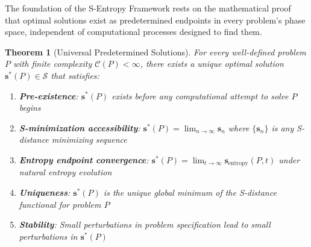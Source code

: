 \documentclass[11pt]{article}
\newtheorem{theorem}{Theorem}[section]
\theoremstyle{definition}
\theoremstyle{remark}
\newcommand{\SEntropy}{\mathcal{S}}
\begin{document}
The foundation of the S-Entropy Framework rests on the mathematical proof that optimal solutions exist as predetermined endpoints in every problem's phase space, independent of computational processes designed to find them.

\begin{theorem}[Universal Predetermined Solutions]
\label{thm:predetermined_solutions}
For every well-defined problem $P$ with finite complexity $\mathcal{C}(P) < \infty$, there exists a unique optimal solution $\mathbf{s}^*(P) \in \SEntropy$ that satisfies:
\begin{enumerate}
\item \textbf{Pre-existence}: $\mathbf{s}^*(P)$ exists before any computational attempt to solve $P$ begins
\item \textbf{S-minimization accessibility}: $\mathbf{s}^*(P) = \lim_{n \to \infty} \mathbf{s}_n$ where $\{\mathbf{s}_n\}$ is any S-distance minimizing sequence
\item \textbf{Entropy endpoint convergence}: $\mathbf{s}^*(P) = \lim_{t \to \infty} \mathbf{s}_{\text{entropy}}(P, t)$ under natural entropy evolution
\item \textbf{Uniqueness}: $\mathbf{s}^*(P)$ is the unique global minimum of the S-distance functional for problem $P$
\item \textbf{Stability}: Small perturbations in problem specification lead to small perturbations in $\mathbf{s}^*(P)$
\end{enumerate}
\end{theorem}
\end{document}
